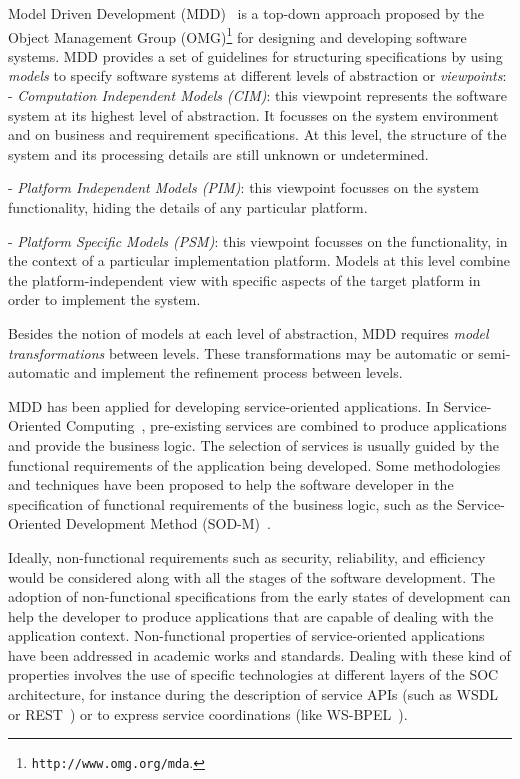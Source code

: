 Model Driven Development (MDD)~\cite{Favre06arigorous} is a top-down approach proposed by the Object Management Group
(OMG)\footnote{\texttt{http://www.omg.org/mda}.} for designing and developing software systems. 
MDD provides a set of guidelines for  structuring  specifications by using \textit{models} to specify software systems at different levels of abstraction or \textit{viewpoints}:\\[1mm]
\noindent 
- \textit{Computation Independent Models (CIM)}: this viewpoint represents the software system at its highest level of abstraction. It focusses on the system
environment and on  business and requirement specifications. 
At this level, the structure of the system  and its processing details are still unknown or undetermined. 

\noindent 
- \textit{Platform Independent Models (PIM)}: this viewpoint focusses on the system functionality, hiding the details of any particular platform. 

\noindent 
- \textit{Platform Specific Models (PSM)}: this viewpoint focusses on the functionality, in the context of a particular implementation platform.
Models at this level combine the platform-independent view with specific aspects of the target platform in order to implement the system.  

Besides the notion of models at each level of abstraction, MDD requires  \textit{model transformations} between levels.
These transformations may be automatic or semi-automatic and implement the refinement process between levels. 

MDD has been applied for developing service-oriented applications.
In Service-Oriented Computing~\cite{scube2010book}, pre-existing services are
combined to produce applications and provide the business logic. The selection of services is usually guided by the functional requirements of the application being developed. 
Some methodologies and techniques have been proposed to help the software
developer in the specification of functional requirements of the business logic,
such as the Service-Oriented Development Method
(SOD-M)~\cite{decastro1}. 

Ideally, non-functional requirements such as
security, reliability, and efficiency
would be considered along with all the stages of the software development. The
adoption of non-functional specifications from the early states of development
can help the developer to produce applications that are capable of dealing with
the application context.
%
%
Non-functional properties of service-oriented applications  have been
addressed in academic works and standards. %
Dealing with these kind of properties involves the use of specific technologies
at different layers of the SOC architecture, for instance during the description
of service APIs (such as WSDL\cite{wsdl} or REST~\cite{rest}) or to express
service coordinations (like WS-BPEL~\cite{bpel03}).

